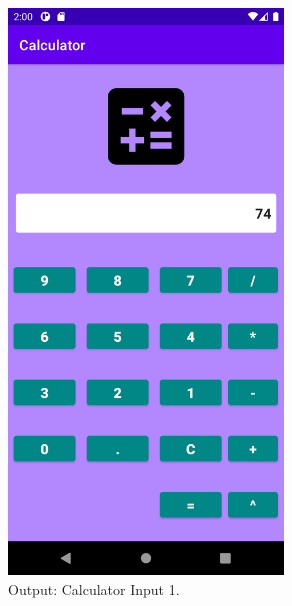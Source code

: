 \documentclass[12pt, a4]{article}
\begin{document}
\subsection*{}
\begin{figure}[h]
\centering
\caption{Output: Calculator Input 1.}
\includegraphics[height=15cm, width=7.3cm]{Calculator/Screenshots/Calculator-1.png}
\end{figure}

\newpage
\end{document}
